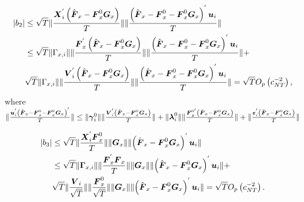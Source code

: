 \documentclass[12pt,a4paper,hyperref]{article}
\DeclarePairedDelimiter\abs{\lvert}{\rvert}%
\DeclarePairedDelimiter\norm{\lVert}{\rVert}%
\begin{document}
\begin{align}
\begin{split}
\abs{b_{2}}&\leq \sqrt{T} \norm{\frac{\boldsymbol{X}^{'}_{i}\left(\hat{\boldsymbol{F}}_{x}-\boldsymbol{F}^{0}_{x}\boldsymbol{G}_{x} \right)}{T}} \norm{\frac{ \left( \hat{\boldsymbol{F}}_{x}-\boldsymbol{F}^{0}_{x}-\boldsymbol{F}^{0}_{x}\boldsymbol{G}_{x}   \right)^{'}\boldsymbol{u}_{i}}{T} } \\
& \leq \sqrt{T} \norm{\Gamma_{x,i}} \norm{\frac{\boldsymbol{F}^{'}_{x}\left(\hat{\boldsymbol{F}}_{x}-\boldsymbol{F}^{0}_{x}\boldsymbol{G}_{x} \right)}{T}} \norm{\frac{ \left( \hat{\boldsymbol{F}}_{x}-\boldsymbol{F}^{0}_{x}-\boldsymbol{F}^{0}_{x}\boldsymbol{G}_{x}  \right)^{'}\boldsymbol{u}_{i}}{T}}+ \\
&\sqrt{T}  \norm{\Gamma_{x,i}} \norm{\frac{\boldsymbol{V}^{'}_{i}\left(\hat{\boldsymbol{F}}_{x}-\boldsymbol{F}^{0}_{x}\boldsymbol{G}_{x} \right)}{T}} \norm{\frac{ \left( \hat{\boldsymbol{F}}_{x}-\boldsymbol{F}^{0}_{x}-\boldsymbol{F}^{0}_{x}\boldsymbol{G}_{x}  \right)^{'}\boldsymbol{u}_{i}}{T}}= \sqrt{T}O_{p}\left( c^{-2}_{NT} \right),
\end{split}
\end{align}
where $\norm{\frac{\boldsymbol{u}^{'}_{i} \left( \hat{\boldsymbol{F}}_{x}-\boldsymbol{F}^{0}_{x}-\boldsymbol{F}^{0}_{x}\boldsymbol{G}_{x}  \right)^{'}}{T}} \leq \norm{\boldsymbol{\gamma}^{0}_{i}} \norm{\frac{\boldsymbol{V}^{'}_{i}\left(\hat{\boldsymbol{F}}_{x}-\boldsymbol{F}^{0}_{x}\boldsymbol{G}_{x} \right)}{T}} + \norm{\boldsymbol{\lambda}^{0}_{i}} \norm{\frac{\boldsymbol{F}^{0'}_{y} \left( \hat{\boldsymbol{F}}_{x}-\boldsymbol{F}^{0}_{x}\boldsymbol{G}_{x}  \right)}{T}}+ \norm{\frac{\boldsymbol{\varepsilon}^{'}_{i} \left( \hat{\boldsymbol{F}}_{x}-\boldsymbol{F}^{0}_{x}\boldsymbol{G}_{x}  \right)}{T}} $


\begin{align}
\begin{split}
\abs{b_{3}}&\leq  \sqrt{T} \norm{\frac{\boldsymbol{X}^{'}_{i}\boldsymbol{F}^{0}_{x} }{T}} \norm{\boldsymbol{G}_{x} } \norm{ \left( \hat{\boldsymbol{F}}_{x}-\boldsymbol{F}^{0}_{x}\boldsymbol{G}_{x}   \right)^{'}\boldsymbol{u}_{i} } \\
&\leq \sqrt{T} \norm{\boldsymbol{\Gamma}_{x,i}} \norm{\frac{\boldsymbol{F}^{'}_{x}\boldsymbol{F}_{x}}{T}} \norm{\boldsymbol{G}_{x}} \norm{ \left( \hat{\boldsymbol{F}}_{x}-\boldsymbol{F}^{0}_{x}\boldsymbol{G}_{x}   \right)^{'}\boldsymbol{u}_{i}} +\\
&\sqrt{T} \norm{ \frac{\boldsymbol{V}_{i}}{\sqrt{T}} } \norm{\frac{\boldsymbol{F}^{0}_{x}}{\sqrt{T}} } \norm{\boldsymbol{G}_{x}} \norm{ \left( \hat{\boldsymbol{F}}_{x}-\boldsymbol{F}^{0}_{x}\boldsymbol{G}_{x}   \right)^{'}\boldsymbol{u}_{i}}=\sqrt{T}O_{p}\left( c^{-2}_{NT} \right).
\end{split}
\end{align}
\end{document}
